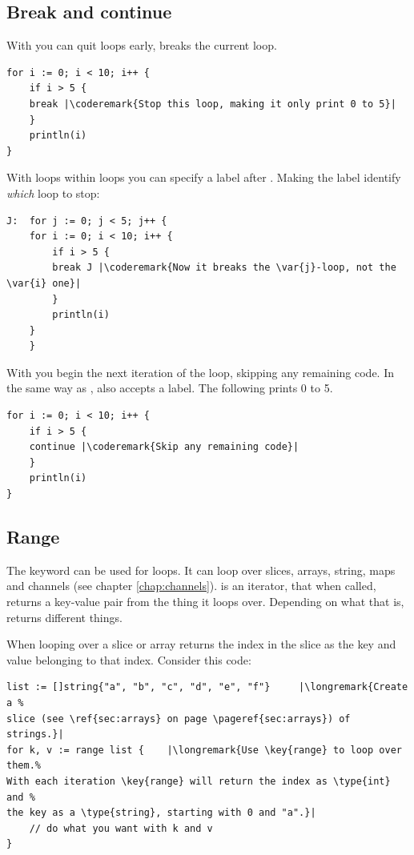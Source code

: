 \subsection{Break and continue}
With  you can quit loops early,  breaks
the current loop.
\begin{lstlisting}
for i := 0; i < 10; i++ {
    if i > 5 {
	break |\coderemark{Stop this loop, making it only print 0 to 5}|
    }
    println(i)
}
\end{lstlisting}
With loops within loops you can specify a label after .
Making the label identify \emph{which} loop to stop:
\begin{lstlisting}
J:  for j := 0; j < 5; j++ {
	for i := 0; i < 10; i++ {
	    if i > 5 { 
		break J	|\coderemark{Now it breaks the \var{j}-loop, not the \var{i} one}|
	    }
	    println(i)
	}
    } 
\end{lstlisting}

With  you begin the next iteration of the
loop, skipping any remaining code. In the same way as ,
 also accepts a label. The following prints 0 to 5.
\begin{lstlisting}
for i := 0; i < 10; i++ {
    if i > 5 {
	continue |\coderemark{Skip any remaining code}|
    }
    println(i)
}
\end{lstlisting}

\subsection{Range}
The keyword  can be used for loops. It
can loop over slices, arrays, string, maps and channels (see chapter
\ref{chap:channels}).  is
an iterator, that when called, returns a key-value pair from the thing it
loops over. Depending on what that is,  returns
different things.

When looping over a slice or array  returns the index in the
slice as the key and value belonging to that index.
Consider this code: 
\begin{lstlisting}
list := []string{"a", "b", "c", "d", "e", "f"}     |\longremark{Create a %
slice (see \ref{sec:arrays} on page \pageref{sec:arrays}) of strings.}|
for k, v := range list {	|\longremark{Use \key{range} to loop over them.%
With each iteration \key{range} will return the index as \type{int} and %
the key as a \type{string}, starting with 0 and "a".}|
    // do what you want with k and v
}
\end{lstlisting}
\showremarks

